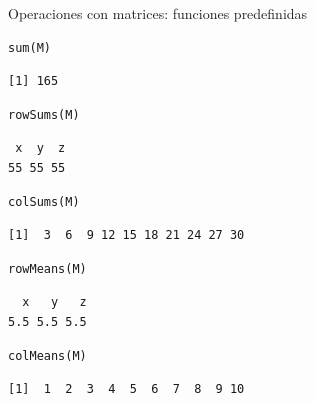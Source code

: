 \documentclass[xcolor={usenames,svgnames,dvipsnames}]{beamer}
\begin{document}
\begin{frame}[fragile,label=sec-2-2-8]{Operaciones con matrices: funciones predefinidas}
 \lstset{language=R,label= ,caption= ,numbers=none}
\begin{lstlisting}
sum(M)
\end{lstlisting}

\begin{verbatim}
[1] 165
\end{verbatim}

\lstset{language=R,label= ,caption= ,numbers=none}
\begin{lstlisting}
rowSums(M)
\end{lstlisting}

\begin{verbatim}
 x  y  z 
55 55 55
\end{verbatim}

\lstset{language=R,label= ,caption= ,numbers=none}
\begin{lstlisting}
colSums(M)
\end{lstlisting}

\begin{verbatim}
[1]  3  6  9 12 15 18 21 24 27 30
\end{verbatim}

\lstset{language=R,label= ,caption= ,numbers=none}
\begin{lstlisting}
rowMeans(M)
\end{lstlisting}

\begin{verbatim}
  x   y   z 
5.5 5.5 5.5
\end{verbatim}

\lstset{language=R,label= ,caption= ,numbers=none}
\begin{lstlisting}
colMeans(M)
\end{lstlisting}

\begin{verbatim}
[1]  1  2  3  4  5  6  7  8  9 10
\end{verbatim}
\end{frame}
\end{document}
